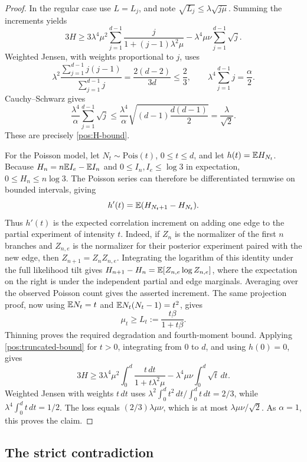 \begin{proof}
In the regular case use \(L=L_j\), and note
\(\sqrt{L_j}\le\lambda\sqrt{j\mu}\). Summing the increments yields
\[
 3H\ge3\lambda^4\mu^2\sum_{j=1}^{d-1}
       \frac{j}{1+(j-1)\lambda^2\mu}
       -\lambda^4\mu\nu\sum_{j=1}^{d-1}\sqrt j.
\]
Weighted Jensen, with weights proportional to \(j\), uses
\[
 \lambda^2\frac{\sum_{j=1}^{d-1}j(j-1)}{\sum_{j=1}^{d-1}j}
 =\frac{2(d-2)}{3d}\le\frac23,
 \qquad \lambda^4\sum_{j=1}^{d-1}j=\frac\alpha2.
\]
Cauchy--Schwarz gives
\[
 \frac{\lambda^4}{\alpha}\sum_{j=1}^{d-1}\sqrt j
 \le\frac{\lambda^4}{\alpha}
       \sqrt{(d-1)\frac{d(d-1)}2}
 =\frac\lambda{\sqrt2}.
\]
These are precisely \eqref{pos:H-bound}.

For the Poisson model, let \(N_t\sim\mathrm{Pois}(t)\), \(0\le t\le d\),
and let \(h(t)=\mathbb E H_{N_t}\). Because
\(H_n=n\mathbb E I_e-\mathbb E I_n\) and \(0\le I_n,I_e\le\log3\) in expectation,
\(0\le H_n\le n\log3\). The Poisson series can therefore be
differentiated termwise on bounded intervals, giving
\[
 h'(t)=\mathbb E(H_{N_t+1}-H_{N_t}).
\]
Thus \(h'(t)\) is the expected correlation increment on adding one edge
to the partial experiment of intensity \(t\). Indeed, if \(Z_n\) is
the normalizer of the first \(n\) branches and \(Z_{n,e}\) is the
normalizer for their posterior experiment paired with the new edge,
then \(Z_{n+1}=Z_n Z_{n,e}\). Integrating the logarithm of this
identity under the full likelihood tilt gives
\(H_{n+1}-H_n=\mathbb E[Z_{n,e}\log Z_{n,e}]\), where the expectation on
the right is under the independent partial and edge marginals.
Averaging over the observed Poisson count gives the asserted increment.
The same projection proof,
now using \(\mathbb E N_t=t\) and \(\mathbb E N_t(N_t-1)=t^2\), gives
\[
 \mu_t\ge L_t:=\frac{t\beta}{1+t\beta}.
\]
Thinning proves the required degradation and fourth-moment bound. Applying
\eqref{pos:truncated-bound} for \(t>0\), integrating from \(0\) to \(d\),
and using \(h(0)=0\), gives
\[
 3H\ge3\lambda^4\mu^2\int_0^d\frac{t\,dt}{1+t\lambda^2\mu}
        -\lambda^4\mu\nu\int_0^d\sqrt t\,dt.
\]
Weighted Jensen with weights \(t\,dt\) uses
\(\lambda^2\int_0^dt^2\,dt/\int_0^dt\,dt=2/3\), while
\(\lambda^4\int_0^dt\,dt=1/2\). The loss equals
\((2/3)\lambda\mu\nu\), which is at most
\(\lambda\mu\nu/\sqrt2\). As \(\alpha=1\), this proves the claim.
\end{proof}

\subsection{The strict contradiction}

